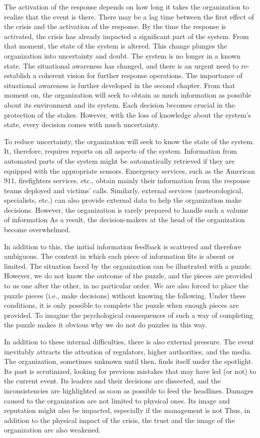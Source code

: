 The activation of the response depends on how long it takes the organization to realize that the event is there.
There may be a lag time between the first effect of the crisis and the activation of the response.
By the time the response is activated, the crisis has already impacted a significant part of the system.
From that moment, the state of the system is altered.
This change plunges the organization into uncertainty and doubt.
The system is no longer in a known state.
The situational awareness has changed, and there is an urgent need to re-establish a coherent vision for further response operations.
The importance of situational awareness is further developed in the second chapter.
From that moment on, the organization will seek to obtain as much information as possible about its environment and its system.
Each decision becomes crucial in the protection of the stakes.
However, with the loss of knowledge about the system's state, every decision comes with much uncertainty.

To reduce uncertainty, the organization will seek to know the state of the system.
It, therefore, requires reports on all aspects of the system.
Information from automated parts of the system might be automatically retrieved if they are equipped with the appropriate sensors.
Emergency services, such as the American 911, firefighters services, etc., obtain mainly their information from the response teams deployed and victims' calls.
Similarly, external services (meteorological, specialists, etc.) can also provide external data to help the organization make decisions.
However, the organization is rarely prepared to handle such a volume of information
As a result, the decision-makers at the head of the organization become overwhelmed.

In addition to this, the initial information feedback is scattered and therefore ambiguous.
The context in which each piece of information fits is absent or limited.
The situation faced by the organization can be illustrated with a puzzle.
However, we do not know the outcome of the puzzle, and the pieces are provided to us one after the other, in no particular order.
We are also forced to place the puzzle pieces (i.e., make decisions) without knowing the following.
Under these conditions, it is only possible to complete the puzzle when enough pieces are provided.
To imagine the psychological consequences of such a way of completing the puzzle makes it obvious why we do not do puzzles in this way.

In addition to these internal difficulties, there is also external pressure.
The event inevitably attracts the attention of regulators, higher authorities, and the media.
The organization, sometimes unknown until then, finds itself under the spotlight.
Its past is scrutinized, looking for previous mistakes that may have led (or not) to the current event.
Its leaders and their decisions are dissected, and the inconsistencies are highlighted as soon as possible to feed the headlines.
Damages caused to the organization are not limited to physical ones.
Its image and reputation might also be impacted, especially if the management is not
Thus, in addition to the physical impact of the crisis, the trust and the image of the organization are also weakened.

